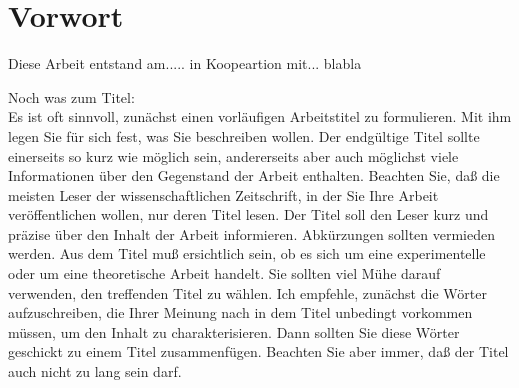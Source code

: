 \chapter*{Vorwort} 
Diese Arbeit entstand am..... in Koopeartion mit... blabla

\vspace{3cm}
Noch was zum Titel:\\
Es ist oft sinnvoll, zunächst einen vorläufigen Arbeitstitel zu formulieren. Mit ihm legen Sie
für sich fest, was Sie beschreiben wollen. Der endgültige Titel sollte einerseits so kurz wie
möglich sein, andererseits aber auch möglichst viele Informationen über den Gegenstand der
Arbeit enthalten. Beachten Sie, daß die meisten Leser der wissenschaftlichen Zeitschrift, in
der Sie Ihre Arbeit veröffentlichen wollen, nur deren Titel lesen. Der Titel soll den Leser kurz
und präzise über den Inhalt der Arbeit informieren. Abkürzungen sollten vermieden werden.
Aus dem Titel muß ersichtlich sein, ob es sich um eine experimentelle oder um eine
theoretische Arbeit handelt. Sie sollten viel Mühe darauf verwenden, den treffenden Titel zu
wählen. Ich empfehle, zunächst die Wörter aufzuschreiben, die Ihrer Meinung nach in dem
Titel unbedingt vorkommen müssen, um den Inhalt zu charakterisieren. Dann sollten Sie diese
Wörter geschickt zu einem Titel zusammenfügen. Beachten Sie aber immer, daß der Titel auch nicht zu lang sein darf.